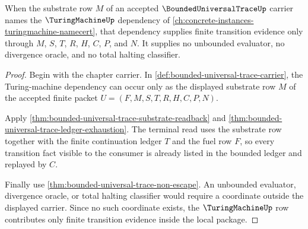 \begin{theorem}
\label{thm:bounded-universal-trace-turing-machine-nonescape}
When the substrate row $M$ of an accepted $\BoundedUniversalTraceUp$ carrier
names the $\TuringMachineUp$ dependency of
\autoref{ch:concrete-instances-turingmachine-namecert}, that dependency
supplies finite transition evidence only through $M$, $S$, $T$, $R$, $H$,
$C$, $P$, and $N$. It supplies no unbounded evaluator, no divergence oracle,
and no total halting classifier.
\end{theorem}
\begin{proof}
Begin with the chapter carrier. In
\autoref{def:bounded-universal-trace-carrier}, the Turing-machine dependency
can occur only as the displayed substrate row $M$ of the accepted finite
packet $U=(F,M,S,T,R,H,C,P,N)$.

Apply \autoref{thm:bounded-universal-trace-substrate-readback} and
\autoref{thm:bounded-universal-trace-ledger-exhaustion}. The terminal read
uses the substrate row together with the finite continuation ledger $T$ and
the fuel row $F$, so every transition fact visible to the consumer is already
listed in the bounded ledger and replayed by $C$.

Finally use \autoref{thm:bounded-universal-trace-non-escape}. An unbounded
evaluator, divergence oracle, or total halting classifier would require a
coordinate outside the displayed carrier. Since no such coordinate exists,
the $\TuringMachineUp$ row contributes only finite transition evidence inside
the local package.
\end{proof}

